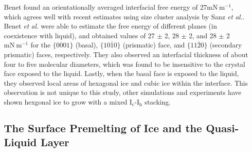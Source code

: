 
Benet found an orientationally averaged interfacial free energy of
$27 \mathrm{mN}~\mathrm{m}^{-1}$, which agrees well with recent
estimates using size cluster analysis by Sanz \textit{et
  al.}\cite{Sanz2013}. Benet \textit{et al.} were able to estimate the
free energy of different planes (in coexistence with liquid), and
obtained values of 27 $\pm$ 2, 28 $\pm$ 2, and 28 $\pm$ 2
$\mathrm{mN}~\mathrm{m}^{-1}$ for the $\{0001\}$ (basal),
$\{10\bar{1}0\}$ (prismatic) face, and $\{11\bar{2}0\}$ (secondary
prismatic) faces, respectively. They also observed an interfacial
thickness of about four to five molecular diameters, which was found
to be insensitive to the crystal face exposed to the liquid. Lastly,
when the basal face is exposed to the liquid, they observed local
areas of hexagonal ice and cubic ice within the interface. This
observation is not unique to this study, other simulations and
experiments have shown hexgonal ice to grow with a mixed
I$_\mathrm{c}$-I$_\mathrm{h}$
stacking.\cite{Malkin2012,Moore2011,Seo2012,Carignano2007,Rozmanov2011}



\subsection{The Surface Premelting of Ice and the Quasi-Liquid Layer}


